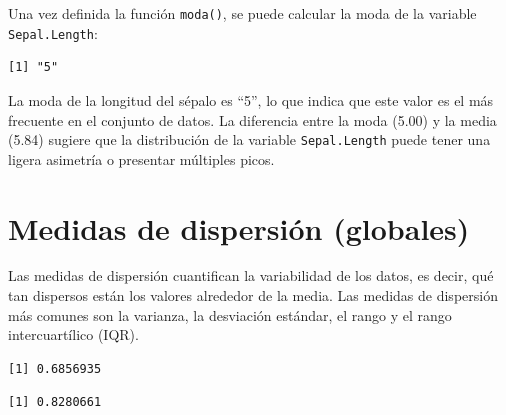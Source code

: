 \documentclass[
  spanish,
  a4paper,
  DIV=11,
  numbers=noendperiod,
  onepage,
  openany]{scrreprt}
\newenvironment{Shaded}{\begin{snugshade}}{\end{snugshade}}
\newcommand{\CommentTok}[1]{\textcolor[rgb]{0.37,0.37,0.37}{#1}}
\newcommand{\FunctionTok}[1]{\textcolor[rgb]{0.28,0.35,0.67}{#1}}
\newcommand{\NormalTok}[1]{\textcolor[rgb]{0.00,0.23,0.31}{#1}}
\newcommand{\SpecialCharTok}[1]{\textcolor[rgb]{0.37,0.37,0.37}{#1}}
\begin{document}
Una vez definida la función \texttt{moda()}, se puede calcular la moda
de la variable \texttt{Sepal.Length}:

\begin{Shaded}
\end{Shaded}

\begin{verbatim}
[1] "5"
\end{verbatim}

La moda de la longitud del sépalo es ``5'', lo que indica que este valor
es el más frecuente en el conjunto de datos. La diferencia entre la moda
(5.00) y la media (5.84) sugiere que la distribución de la variable
\texttt{Sepal.Length} puede tener una ligera asimetría o presentar
múltiples picos.

\section{Medidas de dispersión
(globales)}\label{medidas-de-dispersiuxf3n-globales}

Las medidas de dispersión cuantifican la variabilidad de los datos, es
decir, qué tan dispersos están los valores alrededor de la media. Las
medidas de dispersión más comunes son la varianza, la desviación
estándar, el rango y el rango intercuartílico (IQR).

\begin{Shaded}
\end{Shaded}

\begin{verbatim}
[1] 0.6856935
\end{verbatim}

\begin{Shaded}
\end{Shaded}

\begin{verbatim}
[1] 0.8280661
\end{verbatim}
\end{document}
